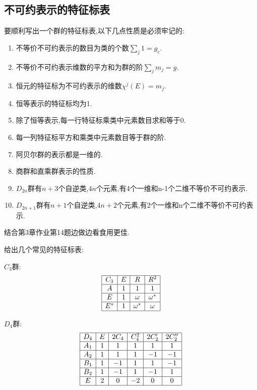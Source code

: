 \documentclass{ctexart}
\begin{document}
\subsection{不可约表示的特征标表}

要顺利写出一个群的特征标表,以下几点性质是必须牢记的:
\begin{enumerate}
    \item 不等价不可约表示的数目为类的个数$\sum_{j}1=g_{c}$.
    \item 不等价不可约表示维数的平方和为群的阶$\sum_{j}m_{j}=g$.
    \item 恒元的特征标为不可约表示的维数$\chi^{j}(E)=m_{j}$.
    \item 恒等表示的特征标均为1.
    \item 除了恒等表示,每一行特征标乘类中元素数目求和等于0.
    \item 每一列特征标平方和乘类中元素数目等于群的阶.
    \item 阿贝尔群的表示都是一维的.
    \item 商群和直乘群表示的性质.
    \item $D_{2n}$群有$n+3$个自逆类,$4n$个元素,有4个一维和n-1个二维不等价不可约表示.
    \item $D_{2n+1}$群有$n+1$个自逆类,$4n+2$个元素,有2个一维和n个二维不等价不可约表示.
\end{enumerate}

结合第3章作业第14题边做边看食用更佳.

给出几个常见的特征标表:

$C_{3}$群:
\[
\begin{array}{|c|c|c|c|}
\hline
C_{3} & E & R & R^{2} \\
\hline
A & 1 & 1 & 1 \\
\hline
E & 1 & \omega & \omega^{*} \\
\hline
E^{*} & 1 & \omega^{*} & \omega \\
\hline
\end{array}
\]

$D_{4}$群:
\[
\begin{array}{|c|c|c|c|c|c|}
\hline
D_{4}  & E & 2C_{4} & C_{4}^{2} & 2C_{2}' & 2C_{2}'' \\
\hline
A_{1} &1&1&1&1&1\\
\hline
A_{2} &1&1&1&-1&-1\\
\hline
B_{1} &1&-1&1&1&-1\\
\hline
B_{2} &1&-1&1&-1&1\\
\hline
E     &2&0&-2&0&0\\
\hline
\end{array}
\]
\end{document}
